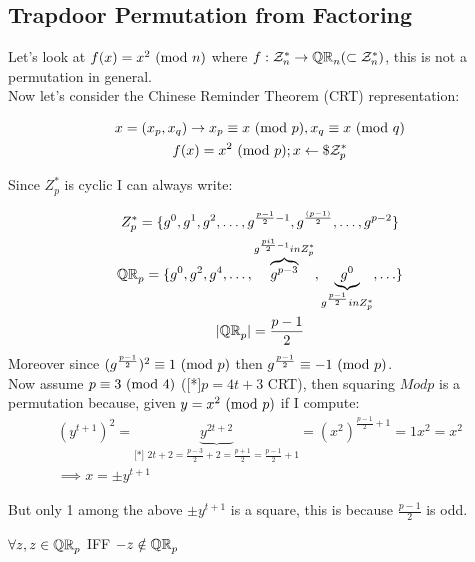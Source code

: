 \subsection{Trapdoor Permutation from Factoring}
Let's look at $f(x)=x^2\Mod{n}$ where $f: \Z_n^* \to \QR[n] (\subset \Z_n^*)$, this is not a permutation in general.\\
Now let's consider the Chinese Reminder Theorem (CRT) representation:

    \begin{gather*}
        x=(x_p,x_q) \rightarrow x_p\equiv x\Mod{p} , x_q\equiv x\Mod{q}\\
        f(x)=x^2\Mod{p}; x \from \$ \Z_p^*
    \end{gather*}

Since $Z_p^*$ is cyclic I can always write:

\begin{gather*}
    Z_p^*=\{g^0,g^1,g^2,\ldots,g^{\frac{p-1}{2}-1},g^{\frac{(p-1)}{2}},\ldots,g^{p-2} \}\\
    \QR[p]=\{g^0,g^2,g^4,\ldots,\overbrace{g^{p-3}}^{g^{\frac{pi1}{2}-1} in Z_p^*},\underbrace{g^0}_{g^{\frac{p-1}{2}}in Z_p^*},\ldots\}\\
    |\QR[p]|=\frac{p-1}{2}
\end{gather*}
Moreover since $(g^{\frac{p-1}{2}})^2 \equiv 1 \Mod{p} $ then $g^{\frac{p-1}{2}} \equiv -1 \Mod{p}$.\\
Now assume $p\equiv 3 \Mod{4}$ ([*]$p=4t+3$ CRT), then squaring $Mod{p}$ is a permutation because, given \underline{$y=x^2 \Mod{p}$} if I compute:
\begin{gather*}
    (y^{t+1})^2=\underbrace{y^{2t+2}}_{\text{[*] }2t+2=\frac{p-3}{2}+2=\frac{p+1}{2}=\frac{p-1}{2}+1}=(x^2)^{\frac{p-1}{2}+1}=1x^2=x^2\\
    \implies x=\pm y^{t+1}
\end{gather*}

But only 1 among the above $\pm y^{t+1}$ is a square, this is because $\frac{p-1}{2}$ is odd.

\begin{lemma}
    $\forall z, z\in \QR[p]$ IFF $-z\notin \QR[p]$
\end{lemma}